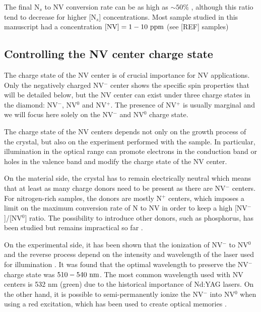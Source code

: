 \documentclass[a4paper,11pt]{report}
\begin{document}
\begin{refsection}
The final N$_s$ to NV conversion rate can be as high as $\sim 50 \%$ \citep{grezes2015storage, hartland2014study}, although this ratio tend to decrease for higher [N$_s$] concentrations. Most sample studied in this manuscript had a concentration $[\rm NV]= 1-10\ \rm ppm$ (see [REF] samples)

\subsection{Controlling the NV center charge state}

The charge state of the NV center is of crucial importance for NV applications. Only the negatively charged NV$^-$ center shows the specific spin properties that will be detailed below, but the NV center can exist under three charge states in the diamond: NV$^-$, NV$^0$ and NV$^+$. The presence of NV$^+$ is usually marginal \citep{hauf2014addressing, pfender2017protecting} and we will focus here solely on the NV$^-$ and NV$^0$ charge state.

The charge state of the NV centers depends not only on the growth process of the crystal, but also on the experiment performed with the sample. In particular, illumination in the optical range can promote electrons in the conduction band or holes in the valence band and modify the charge state of the NV center.

On the material side, the crystal has to remain electrically neutral which means that at least as many charge donors need to be present as there are NV$^-$ centers. For nitrogen-rich samples, the donors are mostly N$^+$ centers, which imposes a limit on the maximum conversion rate of N to NV in order to keep a high [NV$^-$]/[NV$^0$] ratio. The possibility to introduce other donors, such as phosphorus, has been studied \citep{doi2016pure} but remains impractical so far \citep{barry2020sensitivity}.

On the experimental side, it has been shown that the ionization of NV$^-$ to NV$^0$ and the reverse process depend on the intensity and wavelength of the laser used for illumination \citep{aslam2013photo}. It was found that the optimal wavelength to preserve the NV$^-$ charge state was  $510-540\ \rm nm$. The most common wavelength used with NV centers is 532 nm (green) due to the historical importance of Nd:YAG lasers. On the other hand, it is possible to semi-permanently ionize the NV$^-$ into NV$^0$ when using a red excitation, which has been used to create optical memories \citep{dhomkar2016long}.


\end{refsection}
\end{document}
